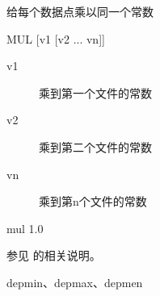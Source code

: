 \label{cmd:mul}

给每个数据点乘以同一个常数

\begin{SACSTX}
MUL [v1 [v2 ... vn]]
\end{SACSTX}

\begin{description}
\item [v1] 乘到第一个文件的常数
\item [v2] 乘到第二个文件的常数
\item [vn] 乘到第n个文件的常数
\end{description}

\begin{SACDFT}
mul 1.0
\end{SACDFT}

参见  的相关说明。

depmin、depmax、depmen
